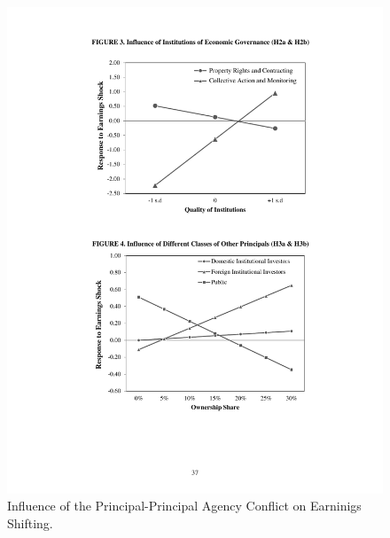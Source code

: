 \begin{figure}[h]
	\centering
	\caption{Influence of the Principal-Principal Agency Conflict on Earninigs Shifting.}
	\vspace{1em}
	\label{fig:Interppa}
	\includegraphics[width=1.00\textwidth]{chapter01/Interactions-PPA.pdf}	
\end{figure}
